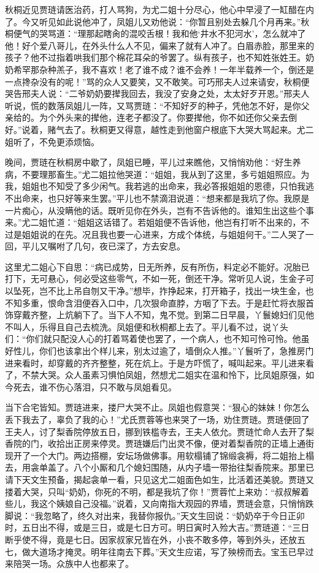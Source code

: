 秋桐近见贾琏请医治药，打人骂狗，为尤二姐十分尽心，他心中早浸了一缸醋在内了。今又听见如此说他冲了，凤姐儿又劝他说：``你暂且别处去躲几个月再来。''秋桐便气的哭骂道：``理那起瞎肏的混咬舌根！我和他`井水不犯河水'，怎么就冲了他！好个爱八哥儿，在外头什么人不见，偏来了就有人冲了。白眉赤脸，那里来的孩子？他不过指着哄我们那个棉花耳朵的爷罢了。纵有孩子，也不知姓张姓王。奶奶希罕那杂种羔子，我不喜欢！老了谁不成？谁不会养！一年半载养一个，倒还是一点搀杂没有的呢！''骂的众人又要笑，又不敢笑。可巧邢夫人过来请安，秋桐便哭告邢夫人说：``二爷奶奶要撵我回去，我没了安身之处，太太好歹开恩。''邢夫人听说，慌的数落凤姐儿一阵，又骂贾琏：``不知好歹的种子，凭他怎不好，是你父亲给的。为个外头来的撵他，连老子都没了。你要撵他，你不如还你父亲去倒好。''说着，赌气去了。秋桐更又得意，越性走到他窗户根底下大哭大骂起来。尤二姐听了，不免更添烦恼。

晚间，贾琏在秋桐房中歇了，凤姐已睡，平儿过来瞧他，又悄悄劝他：``好生养病，不要理那畜生。''尤二姐拉他哭道：``姐姐，我从到了这里，多亏姐姐照应。为我，姐姐也不知受了多少闲气。我若逃的出命来，我必答报姐姐的恩德，只怕我逃不出命来，也只好等来生罢。''平儿也不禁滴泪说道：``想来都是我坑了你。我原是一片痴心，从没瞒他的话。既听见你在外头，岂有不告诉他的。谁知生出这些个事来。''尤二姐忙道：``姐姐这话错了。若姐姐便不告诉他，他岂有打听不出来的，不过是姐姐说的在先。况且我也要一心进来，方成个体统，与姐姐何干。''二人哭了一回，平儿又嘱咐了几句，夜已深了，方去安息。

这里尤二姐心下自思：``病已成势，日无所养，反有所伤，料定必不能好。况胎已打下，无可悬心，何必受这些零气，不如一死，倒还干净。常听见人说，生金子可以坠死，岂不比上吊自刎又干净。''想毕，拃挣起来，打开箱子，找出一块生金，也不知多重，恨命含泪便吞入口中，几次狠命直脖，方咽了下去。于是赶忙将衣服首饰穿戴齐整，上炕躺下了。当下人不知，鬼不觉。到第二日早晨，丫鬟媳妇们见他不叫人，乐得且自己去梳洗。凤姐便和秋桐都上去了。平儿看不过，说丫头们：``你们就只配没人心的打着骂着使也罢了，一个病人，也不知可怜可怜。他虽好性儿，你们也该拿出个样儿来，别太过逾了，墙倒众人推。''丫鬟听了，急推房门进来看时，却穿戴的齐齐整整，死在炕上。于是方吓慌了，喊叫起来。平儿进来看了，不禁大哭。众人虽素习惧怕凤姐，然想尤二姐实在温和怜下，比凤姐原强，如今死去，谁不伤心落泪，只不敢与凤姐看见。

当下合宅皆知。贾琏进来，搂尸大哭不止。凤姐也假意哭：``狠心的妹妹！你怎么丢下我去了，辜负了我的心！''尤氏贾蓉等也来哭了一场，劝住贾琏。贾琏便回了王夫人，讨了梨香院停放五日，挪到铁槛寺去，王夫人依允。贾琏忙命人去开了梨香院的门，收拾出正房来停灵。贾琏嫌后门出灵不像，便对着梨香院的正墙上通街现开了一个大门。两边搭棚，安坛场做佛事。用软榻铺了锦缎衾褥，将二姐抬上榻去，用衾单盖了。八个小厮和几个媳妇围随，从内子墙一带抬往梨香院来。那里已请下天文生预备，揭起衾单一看，只见这尤二姐面色如生，比活着还美貌。贾琏又搂着大哭，只叫``奶奶，你死的不明，都是我坑了你！''贾蓉忙上来劝：``叔叔解着些儿，我这个姨娘自己没福。''说着，又向南指大观园的界墙，贾琏会意，只悄悄跌脚说：``我忽略了，终久对出来，我替你报仇。''天文生回说：``奶奶卒于今日正卯时，五日出不得，或是三日，或是七日方可。明日寅时入殓大吉。''贾琏道：``三日断乎使不得，竟是七日。因家叔家兄皆在外，小丧不敢多停，等到外头，还放五七，做大道场才掩灵。明年往南去下葬。''天文生应诺，写了殃榜而去。宝玉已早过来陪哭一场。众族中人也都来了。

